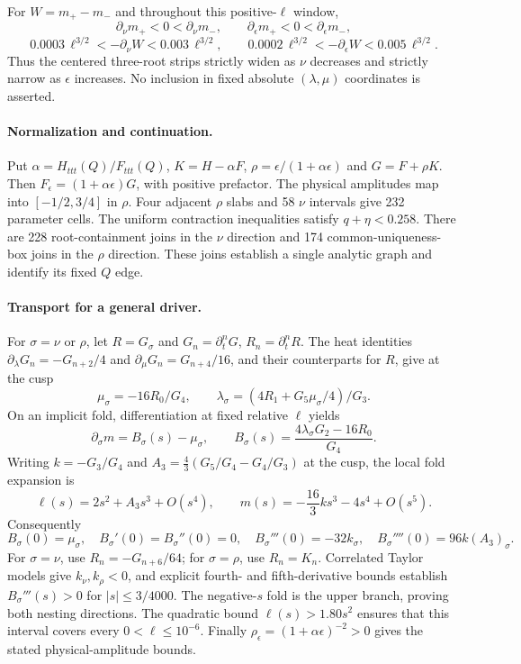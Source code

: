 For $W=m_+-m_-$ and throughout this positive-$\ell$ window,
\[
 \partial_\nu m_+<0<\partial_\nu m_-,
 \qquad
 \partial_\epsilon m_+<0<\partial_\epsilon m_-,
\]
\[
 0.0003\,\ell^{3/2}<-\partial_\nu W<0.003\,\ell^{3/2},
 \qquad
 0.0002\,\ell^{3/2}<-\partial_\epsilon W<0.005\,\ell^{3/2}.
\]
Thus the centered three-root strips strictly widen as $\nu$
decreases and strictly narrow as $\epsilon$ increases.
No inclusion in fixed absolute $(\lambda,\mu)$ coordinates is asserted.

\paragraph{Normalization and continuation.}
Put $\alpha=H_{ttt}(Q)/F_{ttt}(Q)$,
$K=H-\alpha F$, $\rho=\epsilon/(1+\alpha\epsilon)$ and
$G=F+\rho K$. Then
$F_\epsilon=(1+\alpha\epsilon)G$, with positive prefactor.
The physical amplitudes map into $[-1/2,3/4]$ in $\rho$.
Four adjacent $\rho$ slabs and 58 $\nu$ intervals give 232
parameter cells. The uniform contraction inequalities satisfy
$q+\eta<0.258$. There are 228 root-containment joins in the
$\nu$ direction and 174 common-uniqueness-box joins in the
$\rho$ direction. These joins establish a single analytic
graph and identify its fixed $Q$ edge.

\paragraph{Transport for a general driver.}
For $\sigma=\nu$ or $\rho$, let $R=G_\sigma$ and
$G_n=\partial_t^nG$, $R_n=\partial_t^nR$. The heat identities
$\partial_\lambda G_n=-G_{n+2}/4$ and
$\partial_\mu G_n=G_{n+4}/16$, and their counterparts for $R$,
give at the cusp
\[
 \mu_\sigma=-16R_0/G_4,\qquad
 \lambda_\sigma=(4R_1+G_5\mu_\sigma/4)/G_3.
\]
On an implicit fold, differentiation at fixed relative $\ell$ yields
\[
 \partial_\sigma m=B_\sigma(s)-\mu_\sigma,\qquad
 B_\sigma(s)=\frac{4\lambda_\sigma G_2-16R_0}{G_4}.
\]
Writing $k=-G_3/G_4$ and
$A_3=\frac43(G_5/G_4-G_4/G_3)$ at the cusp, the local fold
expansion is
\[
 \ell(s)=2s^2+A_3s^3+O(s^4),\qquad
 m(s)=-\frac{16}{3}ks^3-4s^4+O(s^5).
\]
Consequently
\[
 B_\sigma(0)=\mu_\sigma,\quad
 B_\sigma'(0)=B_\sigma''(0)=0,\quad
 B_\sigma'''(0)=-32k_\sigma,\quad
 B_\sigma''''(0)=96k(A_3)_\sigma .
\]
For $\sigma=\nu$, use $R_n=-G_{n+6}/64$; for $\sigma=\rho$,
use $R_n=K_n$. Correlated Taylor models give $k_\nu,k_\rho<0$,
and explicit fourth- and fifth-derivative bounds establish
$B_\sigma'''(s)>0$ for $|s|\leq3/4000$.
The negative-$s$ fold is the upper branch, proving both nesting
directions. The quadratic bound
$\ell(s)>1.80s^2$ ensures that this interval covers every
$0<\ell\leq10^{-6}$. Finally
$\rho_\epsilon=(1+\alpha\epsilon)^{-2}>0$ gives the stated
physical-amplitude bounds.

